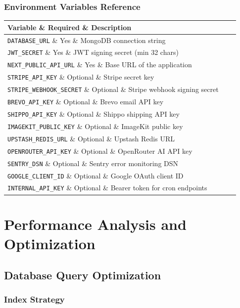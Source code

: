 \documentclass[12pt,a4paper]{report}
\begin{document}
\subsection{Environment Variables Reference}
\begin{center}
\begin{tabularx}{\textwidth}{llX}
  \toprule
  \textbf{Variable} \& \textbf{Required} \& \textbf{Description} \\
  \midrule
  \texttt{DATABASE\_URL} \& Yes \& MongoDB connection string \\
  \texttt{JWT\_SECRET} \& Yes \& JWT signing secret (min 32 chars) \\
  \texttt{NEXT\_PUBLIC\_API\_URL} \& Yes \& Base URL of the application \\
  \texttt{STRIPE\_API\_KEY} \& Optional \& Stripe secret key \\
  \texttt{STRIPE\_WEBHOOK\_SECRET} \& Optional \& Stripe webhook signing secret \\
  \texttt{BREVO\_API\_KEY} \& Optional \& Brevo email API key \\
  \texttt{SHIPPO\_API\_KEY} \& Optional \& Shippo shipping API key \\
  \texttt{IMAGEKIT\_PUBLIC\_KEY} \& Optional \& ImageKit public key \\
  \texttt{UPSTASH\_REDIS\_URL} \& Optional \& Upstash Redis URL \\
  \texttt{OPENROUTER\_API\_KEY} \& Optional \& OpenRouter AI API key \\
  \texttt{SENTRY\_DSN} \& Optional \& Sentry error monitoring DSN \\
  \texttt{GOOGLE\_CLIENT\_ID} \& Optional \& Google OAuth client ID \\
  \texttt{INTERNAL\_API\_KEY} \& Optional \& Bearer token for cron endpoints \\
  \bottomrule
\end{tabularx}
\end{center}

\chapter{Performance Analysis and Optimization}
\section{Database Query Optimization}

\subsection{Index Strategy}
\end{document}

